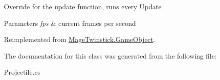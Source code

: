 Override for the update function, runs every Update 


\begin{DoxyParams}{Parameters}
{\em fps} & current frames per second\\
\hline
\end{DoxyParams}


Reimplemented from \hyperlink{class_mage_twinstick_1_1_game_object_a3de8248d06d234f8335525bbb28ccacc}{Mage\+Twinstick.\+Game\+Object}.



The documentation for this class was generated from the following file\+:\begin{DoxyCompactItemize}
\item 
Projectile.\+cs\end{DoxyCompactItemize}
